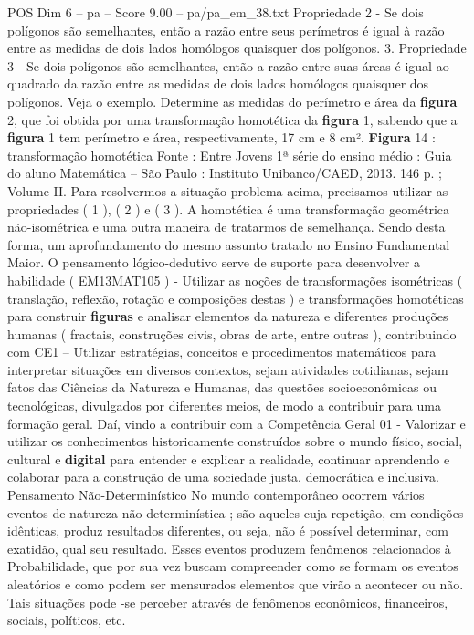 \begin{textsample}{POS Dim 6 – pa – Score 9.00 – pa/pa\_em\_38.txt}
Propriedade 2 - Se dois polígonos são semelhantes, então a razão entre seus perímetros é igual à razão entre as medidas de dois lados homólogos quaisquer dos polígonos. 3.
Propriedade 3 - Se dois polígonos são semelhantes, então a razão entre suas áreas é igual ao quadrado da razão entre as medidas de dois lados homólogos quaisquer dos polígonos.
Veja o exemplo.
Determine as medidas do perímetro e área da \textbf{figura} 2, que foi obtida por uma transformação homotética da \textbf{figura} 1, sabendo que a \textbf{figura} 1 tem perímetro e área, respectivamente, 17 cm e 8 cm². \textbf{Figura} 14 : transformação homotética Fonte : Entre Jovens 1ª série do ensino médio : Guia do aluno Matemática – São Paulo : Instituto Unibanco/CAED, 2013. 146 p. ; Volume II.
Para resolvermos a situação-problema acima, precisamos utilizar as propriedades ( 1 ), ( 2 ) e ( 3 ).
A homotética é uma transformação geométrica não-isométrica e uma outra maneira de tratarmos de semelhança.
Sendo desta forma, um aprofundamento do mesmo assunto tratado no Ensino Fundamental Maior.
O pensamento lógico-dedutivo serve de suporte para desenvolver a habilidade ( EM13MAT105 ) - Utilizar as noções de transformações isométricas ( translação, reflexão, rotação e composições destas ) e transformações homotéticas para construir \textbf{figuras} e analisar elementos da natureza e diferentes produções humanas ( fractais, construções civis, obras de arte, entre outras ), contribuindo com CE1 – Utilizar estratégias, conceitos e procedimentos matemáticos para interpretar situações em diversos contextos, sejam atividades cotidianas, sejam fatos das Ciências da Natureza e Humanas, das questões socioeconômicas ou tecnológicas, divulgados por diferentes meios, de modo a contribuir para uma formação geral.
Daí, vindo a contribuir com a Competência Geral 01 - Valorizar e utilizar os conhecimentos historicamente construídos sobre o mundo físico, social, cultural e \textbf{digital} para entender e explicar a realidade, continuar aprendendo e colaborar para a construção de uma sociedade justa, democrática e inclusiva.
Pensamento Não-Determinístico No mundo contemporâneo ocorrem vários eventos de natureza não determinística ; são aqueles cuja repetição, em condições idênticas, produz resultados diferentes, ou seja, não é possível determinar, com exatidão, qual seu resultado.
Esses eventos produzem fenômenos relacionados à Probabilidade, que por sua vez buscam compreender como se formam os eventos aleatórios e como podem ser mensurados elementos que virão a acontecer ou não.
Tais situações pode -se perceber através de fenômenos econômicos, financeiros, sociais, políticos, etc.

\end{textsample}
